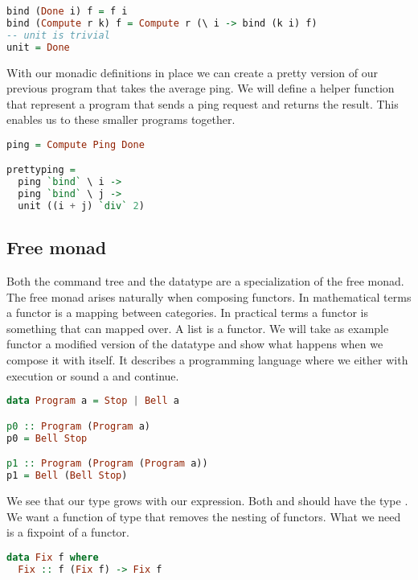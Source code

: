 \begin{lstlisting}[language=Haskell]
bind (Done i) f = f i
bind (Compute r k) f = Compute r (\ i -> bind (k i) f)
-- unit is trivial
unit = Done
\end{lstlisting}

With our monadic definitions in place we can create a pretty version of our previous program that takes the average ping. We will define a helper function that represent a program that sends a ping request and returns the result. This enables us to  these smaller programs together.

\begin{lstlisting}[language=Haskell]
ping = Compute Ping Done

prettyping =
  ping `bind` \ i ->
  ping `bind` \ j ->
  unit ((i + j) `div` 2)
\end{lstlisting}

\subsection{\label{section:freemonad}Free monad}
Both the command tree and the  datatype are a specialization of the free monad\autocite{swierstra2008data}. The free monad arises naturally when composing functors. In mathematical terms a functor is a mapping between categories\autocite{barr1990category}. In practical terms a functor is something that can mapped over. A list is a functor. We will take as example functor a modified version of the  datatype and show what happens when we compose it with itself\autocite{freemonadsforall}. It describes a programming language where we either  with execution or sound a  and continue.

\begin{lstlisting}[language=Haskell]
data Program a = Stop | Bell a

p0 :: Program (Program a)
p0 = Bell Stop

p1 :: Program (Program (Program a))
p1 = Bell (Bell Stop)
\end{lstlisting}

We see that our type grows with our expression. Both  and  should have the type . We want a function of type  that removes the nesting of functors. What we need is a fixpoint of a functor.

\begin{lstlisting}[language=Haskell]
data Fix f where
  Fix :: f (Fix f) -> Fix f
\end{lstlisting}

